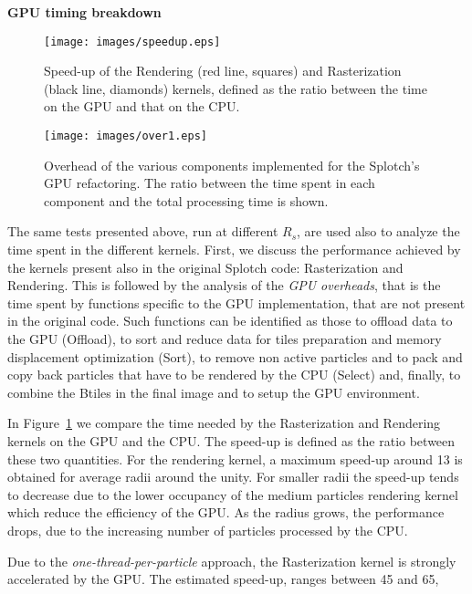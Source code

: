 \documentclass[1p]{elsarticle}
\begin{document}
\medskip
\noindent
{\bf GPU timing breakdown}

\begin{figure}
\centering
\texttt{[image: images/speedup.eps]}
\caption{
Speed-up of the Rendering (red line, squares) and Rasterization (black line, diamonds) kernels, defined as the ratio
between the time on the GPU and that on the CPU.
}
\label{fig:speedup}
\end{figure}

\begin{figure}
\centering
\texttt{[image: images/over1.eps]}
\caption{Overhead of the various components implemented for the Splotch's
GPU refactoring. The ratio between the time spent in each component and the total processing 
time is shown.}
\label{fig:over}
\end{figure}

\noindent
The same tests presented above, run at different $R_s$, are used also to
analyze the 
time spent in the different kernels. First, we discuss the performance 
achieved by the kernels present also in the original Splotch code: Rasterization and
Rendering.
This is followed by the analysis of the  
{\it GPU overheads}, that is the time spent by functions specific
to the GPU implementation, that are not present in the original code. Such functions can 
be identified as those to offload data to the GPU (Offload),
to sort and reduce data for tiles preparation and memory displacement optimization (Sort),
to remove non active particles and to pack and copy back particles that have to 
be rendered by the CPU (Select) and, finally,
to combine the Btiles in the final image and to setup the GPU environment.

In Figure~\ref{fig:speedup} we compare the time needed by the Rasterization and Rendering
kernels on the GPU and the CPU. The speed-up is defined as the ratio between these two
quantities. For the rendering kernel, a maximum speed-up around 13 is obtained for
average radii around the unity. For smaller radii the speed-up tends to decrease due 
to the lower occupancy of the medium particles rendering kernel which reduce the efficiency of the GPU.
As the radius grows, the performance drops, due to the increasing number of particles
processed by the CPU.    

Due to the {\it one-thread-per-particle} approach, the Rasterization kernel is strongly
accelerated by the GPU. The estimated speed-up, ranges between 45 and 65, 
\end{document}
